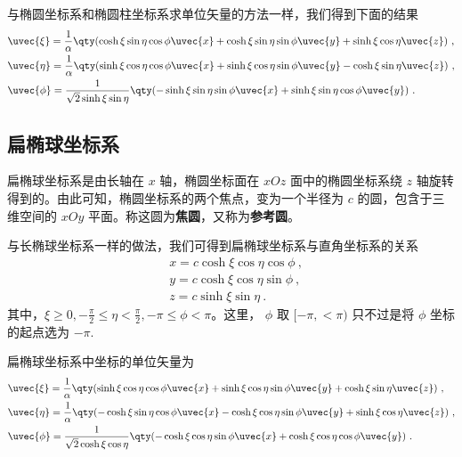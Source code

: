 与椭圆坐标系和椭圆柱坐标系求单位矢量的方法一样，我们得到下面的结果
\begin{equation}
\begin{aligned}
&\uvec{\xi}=\frac{1}{\alpha}\qty(\cosh\xi\sin\eta\cos\phi\uvec{x}+\cosh\xi\sin\eta\sin\phi\uvec{y}+\sinh\xi\cos\eta\uvec{z})~,\\
&\uvec{\eta}=\frac{1}{\alpha}\qty(\sinh\xi\cos\eta\cos\phi\uvec{x}+\sinh\xi\cos\eta\sin\phi\uvec{y}-\cosh\xi\sin\eta\uvec{z})~,\\
&\uvec{\phi}=\frac{1}{\sqrt{2}\sinh\xi\sin\eta}\qty(-\sinh\xi\sin\eta\sin\phi\uvec{x}+\sinh\xi\sin\eta\cos\phi\uvec{y})~.
\end{aligned}
\end{equation}
\subsection{扁椭球坐标系}
扁椭球坐标系是由长轴在 $x$ 轴，椭圆坐标面在 $xOz$ 面中的椭圆坐标系绕 $z$ 轴旋转得到的。由此可知，椭圆坐标系的两个焦点，变为一个半径为 $c$ 的圆，包含于三维空间的 $xOy$ 平面。称这圆为\textbf{焦圆}，又称为\textbf{参考圆}。

与长椭球坐标系一样的做法，我们可得到扁椭球坐标系与直角坐标系的关系
\begin{equation}\label{eq_EliCor_11}
\begin{aligned}
&x=c\cosh\xi\cos\eta\cos\phi~,\\
&y=c\cosh\xi\cos\eta\sin\phi~,\\
&z=c\sinh\xi\sin\eta~.
\end{aligned}
\end{equation}
其中，$\xi\geq 0,-\frac{\pi}{2}\leq\eta<\frac{\pi}{2},-\pi\leq\phi<\pi$。这里， $\phi$ 取 $[-\pi,<\pi)$ 只不过是将 $\phi$ 坐标的起点选为 $-\pi$.

扁椭球坐标系中坐标的单位矢量为
\begin{equation}
\begin{aligned}
&\uvec{\xi}=\frac{1}{\alpha}\qty(\sinh\xi\cos\eta\cos\phi\uvec{x}+\sinh\xi\cos\eta\sin\phi\uvec{y}+\cosh\xi\sin\eta\uvec{z})~,\\
&\uvec{\eta}=\frac{1}{\alpha}\qty(-\cosh\xi\sin\eta\cos\phi\uvec{x}-\cosh\xi\cos\eta\sin\phi\uvec{y}+\sinh\xi\cos\eta\uvec{z})~,\\
&\uvec{\phi}=\frac{1}{\sqrt{2}\cosh\xi\cos\eta}\qty(-\cosh\xi\cos\eta\sin\phi\uvec{x}+\cosh\xi\cos\eta\cos\phi\uvec{y})~.
\end{aligned}
\end{equation}

